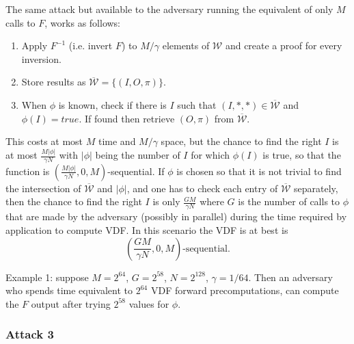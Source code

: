 \documentclass{article}
\begin{document}
The same attack but available to the adversary running the equivalent of only $M$ calls to $F$, works as follows:
\begin{enumerate}
    \item Apply $F^{-1}$ (i.e. invert $F$) to  $M/\gamma$ elements of  $\mathcal{W}$  and create a proof for every inversion.
    \item Store results as $\overline{\mathcal{W}}=\{(I,O,\pi)\}$.
    \item When $\phi$ is known, check if there is $I$ such that  $(I,*,*)\in\overline{\mathcal{W}}$ and $\phi(I)=true$. If found then retrieve $(O,\pi)$ from $\overline{\mathcal{W}}$.
\end{enumerate}
This costs at most $M$ time and $M/\gamma$ space, but the chance to find the right $I$ is at most $\frac{M|\phi|}{\gamma N}$ with $|\phi|$ being the number of $I$ for which $\phi(I)$ is true, so that the function is $(\frac{M|\phi|}{\gamma N},0,M)$-sequential. If $\phi$ is chosen so that it is not trivial to find the intersection of $\overline{\mathcal{W}}$ and $|\phi|$, and one has to check each entry of $\overline{\mathcal{W}}$ separately, then the chance to find the right $I$ is only $\frac{GM}{\gamma N}$ where $G$ is the number of calls to $\phi$ that are made by the adversary (possibly in parallel) during the time required by application to compute VDF. In this scenario the VDF is at best is $$
(\frac{GM}{\gamma N},0,M)\text{-sequential}.
$$

Example 1: suppose   $M=2^{64}$, $G=2^{58}$, $N=2^{128}$, $\gamma=1/64$. Then an adversary who spends time equivalent to $2^{64}$ VDF forward precomputations, can compute the $F$ output after trying $2^{58}$  values for $\phi$.


\subsubsection{Attack 3}\label{sec:att3}
\end{document}
